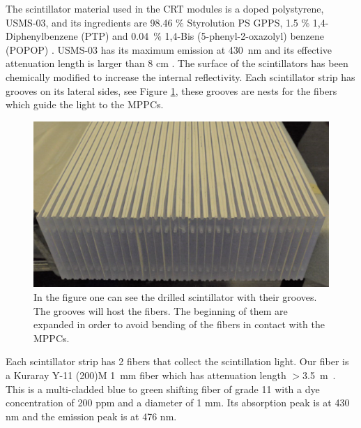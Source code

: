 \documentclass[a4paper]{article}\linespread{1.4}
\begin{document}
The scintillator material used in the CRT modules is a doped polystyrene, USMS-03, and its ingredients are 98.46 $\%$ Styrolution PS GPPS, 1.5  $\%$ 1,4-Diphenylbenzene (PTP) and 0.04~$\%$ 1,4-Bis (5-phenyl-2-oxazolyl) benzene (POPOP) \cite{C}. USMS-03 has its maximum emission at 430~nm and its effective attenuation length is larger than 8 cm %
\cite{E}.
The surface of the scintillators has been chemically modified to increase the internal reflectivity. Each scintillator strip has grooves on its lateral sides, see Figure \ref{fig:drilled}, these grooves are nests for the fibers which guide the light to the MPPCs.
\begin{figure}[h!] \centering \includegraphics[width=120mm,scale=2.0]{figures/drilledpaint.png} \caption{In the figure one can see the drilled scintillator with their grooves. The grooves will host the fibers. The beginning of them are expanded in order to avoid bending of the fibers in contact with the MPPCs.}  \label{fig:drilled}\end{figure}

Each scintillator strip has 2 fibers that collect the scintillation light.
Our fiber is a Kuraray Y-11 (200)M 1~mm fiber which has attenuation length $ >$3.5~m~\cite{D}. This is a multi-cladded blue to green shifting fiber of grade 11 with a dye concentration of 200 ppm and a diameter of 1 mm.
Its absorption peak is at 430 nm and the emission peak is at 476 nm. 
\end{document}

